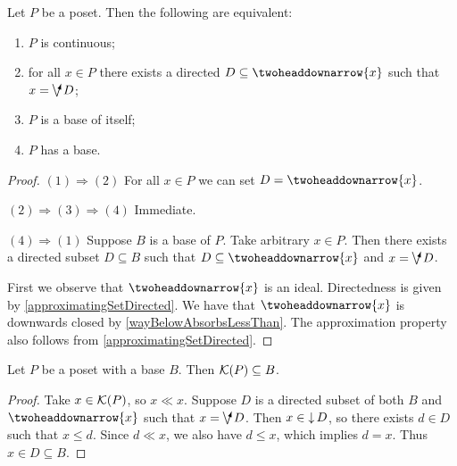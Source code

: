 \begin{proposition} \label{posetContinuousIffHasBase}
Let $P$ be a poset. Then the following are equivalent:
\begin{enumerate}
\item $P$ is continuous;
\item for all $x\in P$ there exists a directed $D\subseteq \ddownset\{x\}$ such that $x = \dirvee D$;
\item $P$ is a base of itself;
\item $P$ has a base.
\end{enumerate}
\end{proposition}
\begin{proof}
$(1) \Rightarrow (2)$ For all $x\in P$ we can set $D = \ddownset \{x\}$.

$(2) \Rightarrow (3) \Rightarrow (4)$ Immediate.

$(4) \Rightarrow (1)$ Suppose $B$ is a base of $P$. Take arbitrary $x\in P$. Then there exists a directed subset $D\subseteq B$ such that $D\subseteq \ddownset\{x\}$ and $x = \dirvee D$.

First we observe that $\ddownset\{x\}$ is an ideal. Directedness is given by \ref{approximatingSetDirected}. We have that $\ddownset\{x\}$ is downwards closed by \ref{wayBelowAbsorbsLessThan}. The approximation property also follows from \ref{approximatingSetDirected}.
\end{proof}

\begin{lemma} \label{compactsInPosetBase}
Let $P$ be a poset with a base $B$. Then $\operatorname{\mathcal{K}}(P)\subseteq B$.
\end{lemma}
\begin{proof}
Take $x\in \operatorname{\mathcal{K}}(P)$, so $x\ll x$. Suppose $D$ is a directed subset of both $B$ and $\ddownset\{x\}$ such that $x = \dirvee D$. Then $x\in \operatorname{\downarrow} D$, so there exists $d\in D$ such that $x\leq d$. Since $d\ll x$, we also have $d\leq x$, which implies $d = x$. Thus $x\in D\subseteq B$.
\end{proof}

